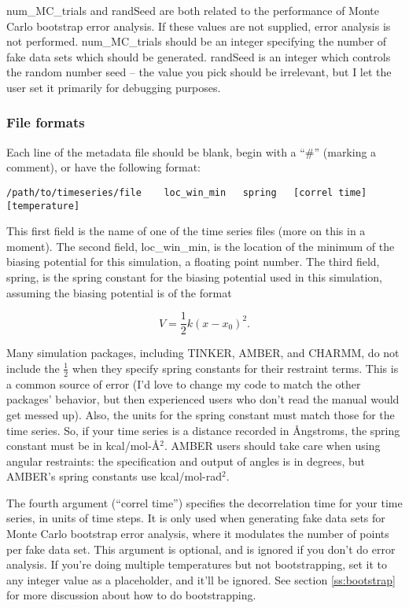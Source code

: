 \documentclass[12pt]{article}
\begin{document}
num\_MC\_trials and randSeed are both related to the performance of Monte
Carlo bootstrap error analysis.  If these values are not supplied, error
analysis is not performed.  num\_MC\_trials should be an integer specifying
the number of fake data sets which should be generated.  randSeed is an
integer which controls the random number seed -- the value you pick should
be irrelevant, but I let the user set it primarily for debugging purposes.

\subsubsection{File formats}
\label{ss:format}

Each line of the metadata file should be blank, begin with a ``\#'' (marking a 
comment), or have the following format:

\begin{footnotesize}
\begin{verbatim}
/path/to/timeseries/file    loc_win_min   spring   [correl time] [temperature]
\end{verbatim}
\end{footnotesize}

This first field is the name of one of the time series files (more on this
in a moment).  The second field, loc\_win\_min, is the location of the
minimum of the biasing potential for this simulation, a floating point
number.  The third field, spring, is the spring constant for the biasing
potential used in this simulation, assuming the biasing potential is of the
format 

\begin{equation}
V = \frac{1}{2} k (x-x_0)^2.  
\end{equation}

Many simulation packages, including TINKER, AMBER, and CHARMM, do not include
the $\frac{1}{2}$ when they specify spring constants for their restraint
terms.  This is a common source of error (I'd love to change my code to match
the other packages' behavior, but then experienced users who don't read the
manual would get messed up).  Also, the units for the spring constant must
match those for the time series.  So, if your time series is a distance
recorded in {\AA}ngstroms, the spring constant must be in kcal/mol-{\AA}$^2$.
AMBER users should take care when using angular restraints: the specification
and output of angles is in degrees, but AMBER's spring constants use
kcal/mol-rad$^2$.

The fourth argument (``correl time'') specifies the decorrelation time for
your time series, in units of time steps.  It is only used when generating
fake data sets for Monte Carlo bootstrap error analysis, where it modulates
the number of points per fake data set.  This argument is optional, and is
ignored if you don't do error analysis.  If you're doing multiple
temperatures but not bootstrapping, set it to any integer value as a
placeholder, and it'll be ignored.  See section \ref{ss:bootstrap} for more
discussion about how to do bootstrapping.
\end{document}
